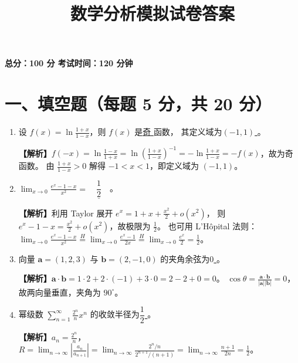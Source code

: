 \documentclass[12pt,a4paper]{ctexart}
\title{数学分析模拟试卷答案}
\author{}
\date{}
\begin{document}
\maketitle

\begin{center}
\textbf{总分：100 分 \quad 考试时间：120 分钟}
\end{center}

\bigskip

\section*{一、填空题（每题 5 分，共 20 分）}

\begin{enumerate}[leftmargin=*,label=\arabic*.]
  \item 设 $f(x) = \ln\frac{1+x}{1-x}$，则 $f(x)$ 是\underline{\quad 奇 \quad}函数，
    其定义域为\underline{\quad $(-1,1)$ \quad}。

    \textbf{【解析】}$f(-x) = \ln\frac{1-x}{1+x} = \ln\!\left(\frac{1+x}{1-x}\right)^{-1}
    = -\ln\frac{1+x}{1-x} = -f(x)$，故为奇函数。
    由 $\frac{1+x}{1-x} > 0$ 解得 $-1 < x < 1$，即定义域为 $(-1,1)$。

  \item $\displaystyle\lim_{x\to 0}\frac{e^x - 1 - x}{x^2} = \underline{\quad \dfrac{1}{2} \quad}$。

    \textbf{【解析】}利用 Taylor 展开 $e^x = 1+x+\frac{x^2}{2}+o(x^2)$，
    则 $e^x-1-x = \frac{x^2}{2}+o(x^2)$，故极限为 $\frac{1}{2}$。
    也可用 L'H\^opital 法则：
    $\lim_{x\to 0}\frac{e^x-1-x}{x^2} \overset{H}{=} \lim_{x\to 0}\frac{e^x-1}{2x}
    \overset{H}{=} \lim_{x\to 0}\frac{e^x}{2} = \frac{1}{2}$。

  \item 向量 $\mathbf{a} = (1,2,3)$ 与 $\mathbf{b} = (2,-1,0)$ 的夹角余弦为\underline{\quad $0$ \quad}。

    \textbf{【解析】}$\mathbf{a}\cdot\mathbf{b} = 1\cdot 2 + 2\cdot(-1) + 3\cdot 0 = 2-2+0=0$。
    $\cos\theta = \frac{\mathbf{a}\cdot\mathbf{b}}{|\mathbf{a}||\mathbf{b}|} = 0$，
    故两向量垂直，夹角为 $90^\circ$。

  \item 幂级数 $\displaystyle\sum_{n=1}^{\infty}\frac{2^n}{n}x^n$ 的收敛半径为\underline{\quad $\dfrac{1}{2}$ \quad}。

    \textbf{【解析】}$a_n = \frac{2^n}{n}$，
    $R = \lim_{n\to\infty}\left|\frac{a_n}{a_{n+1}}\right|
    = \lim_{n\to\infty}\frac{2^n/n}{2^{n+1}/(n+1)}
    = \lim_{n\to\infty}\frac{n+1}{2n}
    = \frac{1}{2}$。
\end{enumerate}
\end{document}
